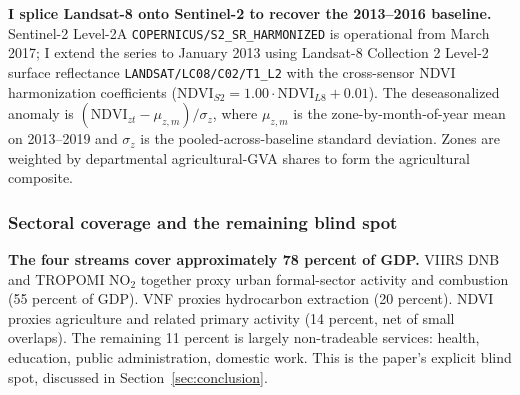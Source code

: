 \documentclass[11pt,letterpaper]{article}
\newcommand{\claim}[1]{\textbf{#1.}}
\begin{document}

\claim{I splice Landsat-8 onto Sentinel-2 to recover the 2013--2016 baseline} Sentinel-2 Level-2A \texttt{COPERNICUS/S2\_SR\_HARMONIZED} is operational from March \num{2017}; I extend the series to January \num{2013} using Landsat-8 Collection 2 Level-2 surface reflectance \texttt{LANDSAT/LC08/C02/T1\_L2} with the \citet{roy_etal2016} cross-sensor NDVI harmonization coefficients ($\mathrm{NDVI}_{S2} = 1.00 \cdot \mathrm{NDVI}_{L8} + 0.01$). The deseasonalized anomaly is $(\mathrm{NDVI}_{zt} - \mu_{z,m}) / \sigma_z$, where $\mu_{z,m}$ is the zone-by-month-of-year mean on \numrange{2013}{2019} and $\sigma_z$ is the pooled-across-baseline standard deviation. Zones are weighted by departmental agricultural-GVA shares to form the agricultural composite.

\subsubsection{Sectoral coverage and the remaining blind spot}

\claim{The four streams cover approximately \num{78} percent of GDP} VIIRS DNB and TROPOMI NO$_2$ together proxy urban formal-sector activity and combustion (\num{55} percent of GDP). VNF proxies hydrocarbon extraction (\num{20} percent). NDVI proxies agriculture and related primary activity (\num{14} percent, net of small overlaps). The remaining \num{11} percent is largely non-tradeable services: health, education, public administration, domestic work. This is the paper's explicit blind spot, discussed in Section~\ref{sec:conclusion}.
\end{document}
